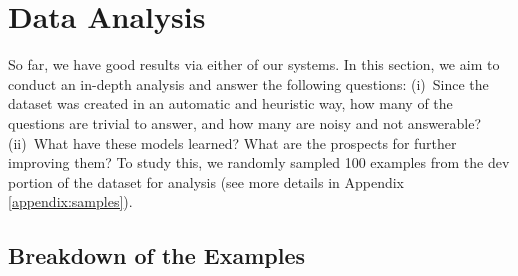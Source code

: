 \section{Data Analysis}
\label{sec:data-analysis}
So far, we have good results via either of our systems. In this section, we aim to conduct an in-depth analysis and answer the following questions: (i)~Since the dataset was created in an automatic and heuristic way, how many of the questions are trivial to answer, and how many are noisy and not answerable? (ii)~What have these models learned? What are the prospects for further improving them?
%
To study this, we randomly sampled 100 examples from the dev portion of the  dataset for analysis (see more details in Appendix \ref{appendix:samples}).



\subsection{Breakdown of the Examples}

